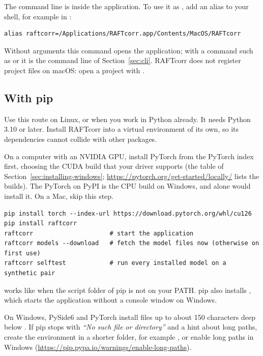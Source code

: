 The command line is inside the application. To use it as , add an alias to your
shell, for example in :

\begin{lstlisting}
alias raftcorr=/Applications/RAFTcorr.app/Contents/MacOS/RAFTcorr
\end{lstlisting}

Without arguments this command opens the application; with a command such as  or
 it is the command line of Section~\ref{sec:cli}. RAFTcorr does not register
 project files on macOS: open a project with .

\subsection{With pip}
\label{sec:installing-pip}

Use this route on Linux, or when you work in Python already. It needs Python 3.10 or later.
Install RAFTcorr into a virtual environment of its own, so its dependencies cannot collide with
other packages.

On a computer with an NVIDIA GPU, install PyTorch from the PyTorch index first, choosing the CUDA
build that your driver supports (the table of Section~\ref{sec:installing-windows};
\url{https://pytorch.org/get-started/locally/} lists the builds). The PyTorch on PyPI is the CPU
build on Windows, and  alone would install it. On a Mac, skip this
step.

\begin{lstlisting}
pip install torch --index-url https://download.pytorch.org/whl/cu126
pip install raftcorr
raftcorr                     # start the application
raftcorr models --download   # fetch the model files now (otherwise on first use)
raftcorr selftest            # run every installed model on a synthetic pair
\end{lstlisting}

 works like  when the script folder of pip is not on your
PATH. pip also installs , which starts the application without a console
window on Windows.

\begin{notebox}
On Windows, PySide6 and PyTorch install files up to about 150 characters deep below
. If pip stops with \emph{``No such file or directory''} and a hint about long
paths, create the environment in a shorter folder, for example
, or enable long paths in Windows
(\url{https://pip.pypa.io/warnings/enable-long-paths}).
\end{notebox}

